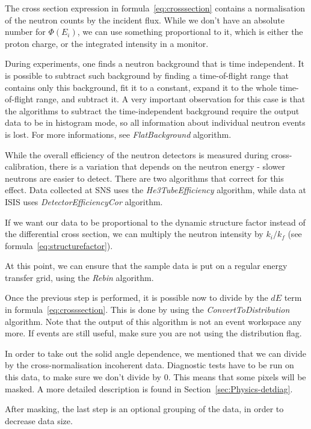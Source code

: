 The cross section expression in formula~\ref{eq:crosssection} contains a normalisation of the neutron counts by the incident flux. While we don't have an absolute number for $\Phi(E_i)$, we can use something proportional to it, which is either the proton charge,  or the integrated intensity in a monitor.

During experiments, one finds a neutron background that is time independent. It is possible to subtract such background by finding a time-of-flight range that contains only this background, fit it to a constant, expand it to the whole time-of-flight range, and subtract it. A very important observation for this case is that the algorithms to subtract the time-independent background require the output data to be in histogram mode, so all information about individual neutron events is lost. For more informations, see \textit{FlatBackground} algorithm.

While the overall efficiency of the neutron detectors is measured during cross-calibration, there is a variation that depends on the neutron energy - slower neutrons are easier to detect. There are two algorithms that correct for this effect. Data collected at SNS uses the \textit{He3TubeEfficiency} algorithm, while data at ISIS uses \textit{DetectorEfficiencyCor} algorithm.

If we want our data to be proportional to the dynamic structure factor instead of the differential cross section, we can multiply the neutron intensity by $k_i/k_f$ (see formula~\ref{eq:structurefactor}). 

At this point, we can ensure that the sample data is put on a regular energy transfer grid, using the \textit{Rebin} algorithm.

Once the previous step is performed, it is possible now to divide by the $dE$ term in formula~\ref{eq:crosssection}. This is done by using the \textit{ConvertToDistribution} algorithm. Note that the output of this algorithm is not an event workspace any more. If events are still useful, make sure you are not using the distribution flag. 

In order to take out the solid angle dependence, we mentioned that we can divide by the cross-normalisation incoherent data. Diagnostic tests have to be run on this data, to make sure we don't divide by 0. This means that some pixels will be masked. A more detailed description is found in Section~\ref{sec:Physics-detdiag}. 

After masking, the last step is an optional grouping of the data, in order to decrease data size.

